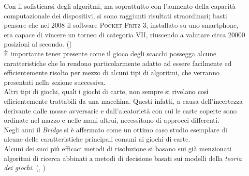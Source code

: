Con il sofisticarsi degli algoritmi, ma soprattutto con l'aumento della capacità computazionale dei dispositivi, si sono raggiunti risultati straordinari; basti pensare che nel 2008 il software \textsc{Pocket Fritz 3}, installato su uno smartphone, era capace di vincere un torneo di categoria VII, riuscendo a valutare circa 20000 posizioni al secondo. (\cite{pocketfritz})\\
È importante tener presente come il gioco degli scacchi possegga alcune caratteristiche che lo rendono particolarmente adatto ad essere facilmente ed efficientemente risolto per mezzo di alcuni tipi di algoritmi, che verranno presentati nella sezione successiva.\\
Altri tipi di giochi, quali i giochi di carte, non sempre si rivelano così efficientemente trattabili da una macchina.
Questi infatti, a causa dell'incertezza derivante dalle mosse avversarie e dall'aleatorietà con cui le carte coperte sono ordinate nel mazzo e nelle mani altrui, necessitano di approcci differenti.\\
Negli anni il \emph{Bridge} si è affermato come un ottimo caso studio esemplare di alcune delle caratteristiche principali comuni ai giochi di carte.\\
Alcuni dei suoi più efficaci metodi di risoluzione si basano sui già menzionati algoritmi di ricerca abbinati a metodi di decisione basati sui modelli della \emph{teoria dei giochi}. (\cite{frank}, \cite{pavel})
